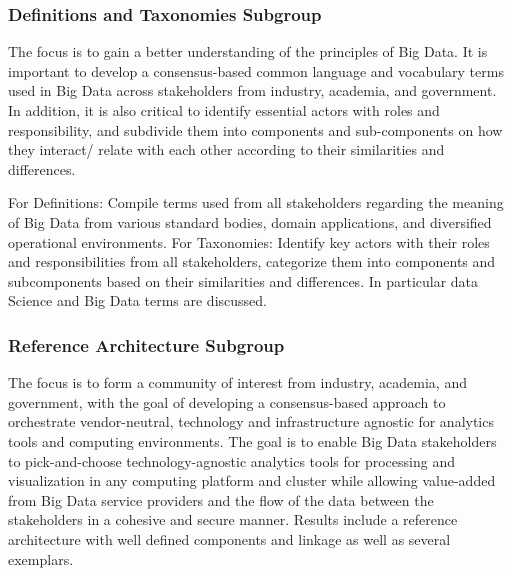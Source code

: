 


\subsubsection{Definitions and Taxonomies
Subgroup}\label{definitions-and-taxonomies-subgroup}

The focus is to gain a better understanding of the principles of Big
Data. It is important to develop a consensus-based common language and
vocabulary terms used in Big Data across stakeholders from industry,
academia, and government. In addition, it is also critical to identify
essential actors with roles and responsibility, and subdivide them into
components and sub-components on how they interact/ relate with each
other according to their similarities and differences.

For Definitions: Compile terms used from all stakeholders regarding the
meaning of Big Data from various standard bodies, domain applications,
and diversified operational environments. For Taxonomies: Identify key
actors with their roles and responsibilities from all stakeholders,
categorize them into components and subcomponents based on their
similarities and differences. In particular data Science and Big Data
terms are discussed.




\subsubsection{Reference Architecture
Subgroup}\label{reference-architecture-subgroup}

The focus is to form a community of interest from industry, academia,
and government, with the goal of developing a consensus-based approach
to orchestrate vendor-neutral, technology and infrastructure agnostic
for analytics tools and computing environments. The goal is to enable
Big Data stakeholders to pick-and-choose technology-agnostic analytics
tools for processing and visualization in any computing platform and
cluster while allowing value-added from Big Data service providers and
the flow of the data between the stakeholders in a cohesive and secure
manner. Results include a reference architecture with well defined
components and linkage as well as several exemplars.




